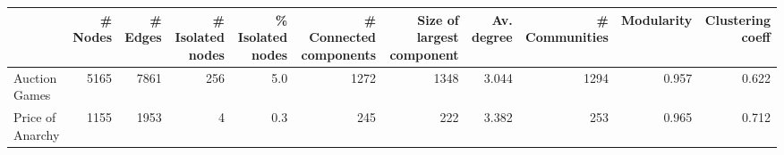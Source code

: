 \begin{tabular}{lrrrrrrrrrr}
\toprule
{} &  \# Nodes &  \# Edges &  \# Isolated nodes &  \% Isolated nodes &  \# Connected components &  Size of largest component &  Av. degree &  \# Communities &  Modularity &  Clustering coeff \\
\midrule
Auction Games    &     5165 &     7861 &               256 &               5.0 &                    1272 &                       1348 &       3.044 &           1294 &       0.957 &             0.622 \\
Price of Anarchy &     1155 &     1953 &                 4 &               0.3 &                     245 &                        222 &       3.382 &            253 &       0.965 &             0.712 \\
\bottomrule
\end{tabular}
